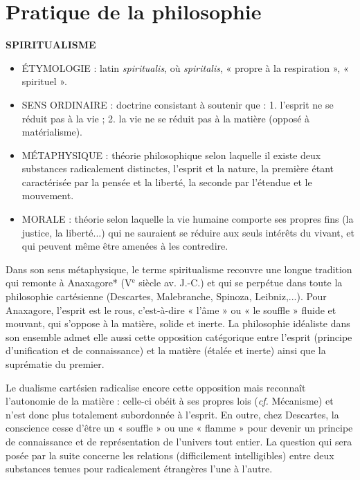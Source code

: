 
\section{Pratique de la philosophie}
{\bf S{\footnotesize PIRITUALISME}}

\begin{itemize}[leftmargin=1cm, label=, itemsep=1pt]
\item {\footnotesize ÉTYMOLOGIE} : latin {\it spiritualis}, où
{\it spiritalis}, « propre à la respiration »,
« spirituel ».
\item {\footnotesize SENS ORDINAIRE} : doctrine consistant à soutenir que : 1.
l'esprit ne se réduit pas à la vie ; 2.
la vie ne se réduit pas à la matière
(opposé à matérialisme).
\item {\footnotesize MÉTAPHYSIQUE} : théorie philosophique
selon laquelle il existe deux substances radicalement distinctes, l’esprit et la nature, la première étant
caractérisée par la pensée et la
liberté, la seconde par l'étendue et
le mouvement.
\item {\footnotesize MORALE} : théorie
selon laquelle la vie humaine
comporte ses propres fins (la justice, la liberté...) qui ne sauraient se
réduire aux seuls intérêts du vivant,
et qui peuvent même être amenées
à les contredire.
\end{itemize}


 

Dans son sens métaphysique, le terme
spiritualisme recouvre une longue tradition qui remonte à Anaxagore* ({\footnotesize V}$^\text{e}$ siècle av. J.-C.) et qui se perpétue dans toute la
philosophie  cartésienne  (Descartes,
Malebranche, Spinoza, Leibniz,...). Pour
Anaxagore, l'esprit est le rous, c'est-à-dire
« l'âme » ou « le souffle » fluide et mouvant, qui s'oppose à la matière, solide et
inerte. La philosophie idéaliste dans son
ensemble admet elle aussi cette opposition catégorique entre l'esprit (principe
d'unification et de connaissance) et la
matière (étalée et inerte) ainsi que la
suprématie du premier.

Le dualisme cartésien radicalise encore
cette opposition mais reconnaît l’autonomie de la matière : celle-ci obéit à ses
propres lois ({\it cf.} Mécanisme) et n'est
donc plus totalement subordonnée à
l'esprit. En outre, chez Descartes, la
conscience cesse d’être un « souffle » ou
une « flamme » pour devenir un principe
de connaissance et de représentation de
l'univers tout entier. La question qui sera
posée par la suite concerne les relations
(difficilement intelligibles) entre deux
substances tenues pour radicalement
étrangères l’une à l’autre.

